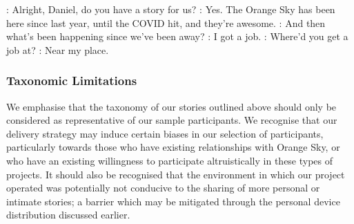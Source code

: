 \begin{drama}

    \kelsspeaks: Alright, Daniel, do you have a story for us?
    \danspeaks: Yes. The Orange Sky has been here since last year, until the COVID hit, and they're awesome.
    \kelsspeaks: And then what's been happening since we've been away?
    \danspeaks: I got a job.
    \kelsspeaks: Where'd you get a job at?
    \danspeaks: Near my place.
\end{drama}

\subsubsection{Taxonomic Limitations}

We emphasise that the taxonomy of our stories outlined above should only be considered as representative of our sample participants. We recognise that our delivery strategy may induce certain biases in our selection of participants, particularly towards those who have existing relationships with Orange Sky, or who have an existing willingness to participate altruistically in these types of projects. It should also be recognised that the environment in which our project operated was potentially not conducive to the sharing of more personal or intimate stories; a barrier which may be mitigated through the personal device distribution discussed earlier.